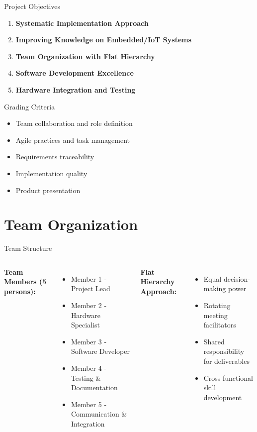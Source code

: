 \documentclass[aspectratio=169]{beamer}
\begin{document}
\begin{frame}{Project Objectives}
\begin{enumerate}
    \item \textbf{Systematic Implementation Approach}
    \item \textbf{Improving Knowledge on Embedded/IoT Systems}
    \item \textbf{Team Organization with Flat Hierarchy}
    \item \textbf{Software Development Excellence}
    \item \textbf{Hardware Integration and Testing}
\end{enumerate}

\begin{block}{Grading Criteria}
\begin{itemize}
    \item Team collaboration and role definition
    \item Agile practices and task management
    \item Requirements traceability
    \item Implementation quality
    \item Product presentation
\end{itemize}
\end{block}
\end{frame}

\section{Team Organization}

\begin{frame}{Team Structure}
\begin{columns}
\textbf{Team Members (5 persons):}
\begin{itemize}
    \item Member 1 - Project Lead
    \item Member 2 - Hardware Specialist
    \item Member 3 - Software Developer
    \item Member 4 - Testing \& Documentation
    \item Member 5 - Communication \& Integration
\end{itemize}

\textbf{Flat Hierarchy Approach:}
\begin{itemize}
    \item Equal decision-making power
    \item Rotating meeting facilitators
    \item Shared responsibility for deliverables
    \item Cross-functional skill development
\end{itemize}
\end{columns}
\end{frame}
\end{document}
